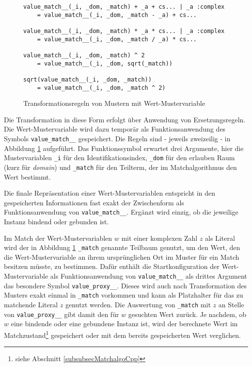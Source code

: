 \begin{figure}
\begin{verbatim}
value_match__(_i, _dom, _match) + _a + cs... | _a :complex 
    = value_match__(_i, _dom, _match - _a) + cs...
        
value_match__(_i, _dom, _match) * _a * cs... | _a :complex 
    = value_match__(_i, _dom, _match / _a) * cs...
        
value_match__(_i, _dom, _match) ^ 2                        
    = value_match__(_i, _dom, sqrt(_match))
        
sqrt(value_match__(_i, _dom, _match))                           
    = value_match__(_i, _dom, _match ^ 2)
\end{verbatim}
\label{figWertMusterBau}
\caption{Transformationsregeln von Mustern mit Wert-Mustervariable}
\end{figure}

Die Transformation in diese Form erfolgt über Anwendung von Ersetzungsregeln. Die Wert-Mustervariable wird dazu temporär als Funktionsanwendung des Symbols \verb|value_match__| gespeichert. Die Regeln sind - jeweils zweizeilig -  in Abbildung \ref{figWertMusterBau} aufgeführt. Das Funktionssymbol erwartet drei Argumente, hier die Mustervariablen \verb|_i| für den Identifikationsindex, \verb|_dom| für den erlauben Raum (kurz für \textit{domain}) und \verb|_match| für den Teilterm, der im Matchalgorithmus den Wert bestimmt. 


Die finale Repräsentation einer Wert-Mustervariablen entspricht in den gespeicherten Informationen fast exakt der Zwischenform als Funktionsanwendung von \verb|value_match__|. Ergänzt wird einzig, ob die jeweilige Instanz bindend oder gebunden ist.

Im Match der Wert-Mustervariablen $w$ mit einer komplexen Zahl $z$ als Literal wird der in Abbildung \ref{figWertMusterBau} \verb|_match| genannte Teilbaum genutzt, um den Wert, den die Wert-Mustervariable an ihrem ursprünglichen Ort im Muster für ein Match besitzen müsste, zu bestimmen. Dafür enthält die Startkonfiguration der Wert-Mustervariable als Funktionsanwendung von \verb|value_match__| als drittes Argument das besondere Symbol \verb|value_proxy__|. Dieses wird auch nach Transformation des Musters exakt einmal in \verb|_match| vorkommen und kann als Platzhalter für das zu matchende Literal $z$ genutzt werden. Die Auswertung von \verb|_match| mit $z$ an Stelle von \verb|value_proxy__| gibt damit den für $w$ gesuchten Wert zurück. Je nachdem, ob $w$ eine bindende oder eine gebundene Instanz ist, wird der berechnete Wert im Matchzustand\footnote{siehe Abschnitt \ref{subsubsecMatchalgoCpp}} gespeichert oder mit dem bereits gespeicherten Wert verglichen.


